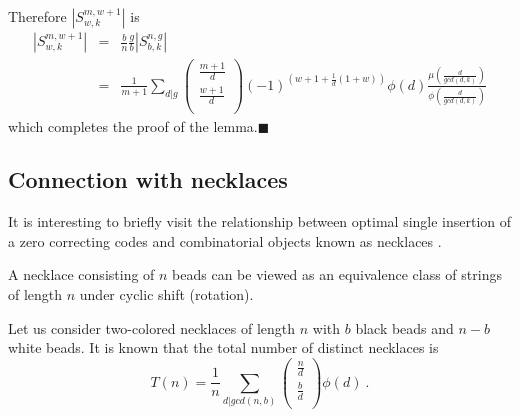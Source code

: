 \documentclass[12pt]{article} \pagestyle{plain} \topmargin
\begin{document}
Therefore $|S_{w,k}^{m,w+1}|$ is
\begin{equation}\begin{array}{lll}
|S_{w,k}^{m,w+1}|&=& \frac{b}{n} \frac{g}{b} |S_{b,k}^{n,g}|\\
{}&=&\frac{1}{m+1}\sum_{d|g} \left(
\begin{array}{c}
                             \frac{m+1}{d} \\
                             \frac{w+1}{d} \\
                           \end{array} \right)(-1)^{(w+1+\frac{1}{d}(1+w))}\phi(d) \frac{\mu\left(\frac{d}{gcd(d,k)}\right)}{\phi\left(\frac{d}{gcd(d,k)}\right)}
\end{array}\end{equation} which completes the proof of the
lemma.\hfill$\blacksquare$

\subsection{Connection with necklaces}

It is interesting to briefly visit the relationship between
optimal single insertion of a zero correcting codes and
combinatorial objects known as necklaces \cite{GR61}.

A necklace consisting of $n$ beads can be viewed as an equivalence
class of strings of length $n$ under cyclic shift (rotation).

Let us consider two-colored necklaces of length $n$ with $b$ black
beads and $n-b$ white beads. It is known that the total number of
distinct necklaces is
\begin{equation}
T(n)=\frac{1}{n} \sum_{d|gcd(n,b)} \left( \begin{array}{c}
                             \frac{n}{d} \\
                             \frac{b}{d} \\
                           \end{array} \right)\phi(d)~.
\end{equation}
\end{document}
